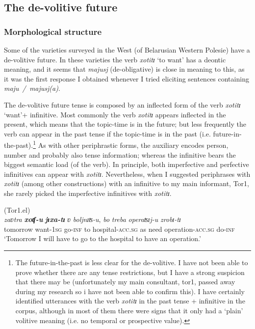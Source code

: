 \documentclass[output=paper,colorlinks,citecolor=brown]{langscibook}
\begin{document}

\subsection{The de-volitive future} \label{sec:roncero:2.2}
\subsubsection{Morphological structure} \label{sec:roncero:2.2.1}
Some of the varieties surveyed in the West (of Belarusian Western Polesie) have a de-volitive future. In these varieties the verb \textit{xotitɪ} ‘to want’ has a deontic meaning, and it seems that \textit{majusj} (de-obligative) is close in meaning to this, as it was the first response I obtained whenever I tried eliciting sentences containing \textit{maju~/~majusj(a)}.

The de-volitive future tense is composed by an inflected form of the verb \textit{xotitɪ} ‘want’+ infinitive. Most commonly the verb \textit{xotitɪ} appears inflected in the present, which means that the topic-time is in the future; but less frequently the verb can appear in the past tense if the topic-time is in the past (i.e. future-in-the-past).\footnote{The future-in-the-past is less clear for the de-volitive. I have not been able to prove whether there are any tense restrictions, but I have a strong suspicion that there may be (unfortunately my main consultant, tor1, passed away during my research so i have not been able to confirm this). I have certainly identified utterances with the verb \textit{xotitɪ} in the past tense + infinitive in the corpus, although in most of them there were signs that it only had a ‘plain’ volitive meaning (i.e. no temporal or prospective value).} As with other periphrastic forms, the auxiliary encodes person, number and probably also tense information; whereas the infinitive bears the biggest semantic load (of the verb). In principle, both imperfective and perfective infinitives can appear with \textit{xotitɪ}. Nevertheless, when I suggested periphrases with \textit{xotitɪ} (among other constructions) with an infinitive to my main informant, Tor1, she rarely picked the imperfective infinitives with\textit{ xotitɪ}.

\ea \label{ex:roncero:13}
    (Tor1.el)\\
    \gll \textit{zaʋtra} \textbf{\textit{xoʧ-u}} \textbf{\textit{jɪxa-tɪ}} \textit{ʋ} \textit{boljnɪʦ-u}, \textit{bo} \textit{treba} \textit{operaʦɪj-u} \textit{zrobɪ-tɪ}\\
    tomorrow want-\textsc{1sg} go-\textsc{inf} to hospital-\textsc{acc.sg} as need operation-\textsc{acc.sg} do-\textsc{inf}\\
    \glt ‘Tomorrow I will have to go to the hospital to have an operation.’
\z
\end{document}
